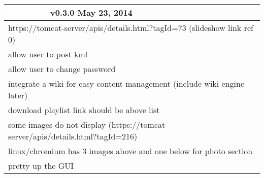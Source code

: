 \documentclass[notitlepage]{article}
\newcommand{\releasedate}{May 23, 2014}
\begin{document}
\begin{center}
\begin{tabular}{ | l | }
\hline
\LARGE\cellcolor{myblue}\textcolor{white}{khallware} v0.3.0 \releasedate{} \\
\hline
https://tomcat-server/apis/details.html?tagId=73 (slideshow link ref 0) \\
\hline
allow user to post kml \\
\hline
allow user to change password \\
\hline
integrate a wiki for easy content management (include wiki engine later) \\
\hline
download playlist link should be above list \\
\hline
some images do not display (https://tomcat-server/apis/details.html?tagId=216) \\
\hline
linux/chromium has 3 images above and one below for photo section \\
\hline
pretty up the GUI \\
\hline

\end{tabular}
\end{center}
\end{document}
